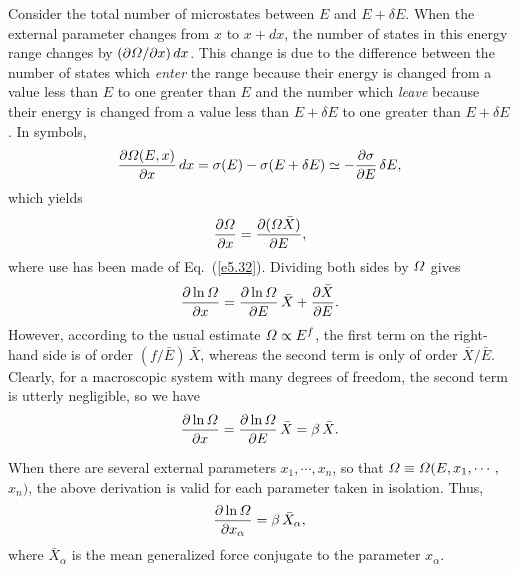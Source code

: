 Consider the total number of microstates between $E$ and $E+\delta E$. When the
external parameter changes from $x$ to $x+dx$, the number of states in this energy
range changes by $(\partial {\mit\Omega}/\partial x)\,dx$. This change is
due to the difference between the number of states which {\em enter}\/ the
range because their energy is changed from a value less than $E$ to one greater than
$E$ and the number which 
{\em leave} 
because their energy is changed from a value less than $E+\delta E$ to one
greater than $E+\delta E$.
In symbols,
\begin{equation}
\frac{\partial {\mit\Omega}(E,x)}{\partial x}\,dx = \sigma(E)- \sigma(E+\delta E)\simeq
-\frac{\partial \sigma}{\partial E}\,\delta E,
\end{equation}
which yields
\begin{equation}
\frac{\partial {\mit\Omega}}{\partial x} = \frac{\partial({\mit\Omega} \bar{X})}{\partial E},
\end{equation}
where use has been made of Eq.~(\ref{e5.32}). Dividing both sides by ${\mit\Omega}$ gives
\begin{equation}
\frac{\partial \ln {\mit\Omega}}{\partial x} = \frac{\partial \ln {\mit\Omega}}{\partial E}\,
\bar{X} +\frac{\partial \bar{X}}{\partial E}.
\end{equation}
However, according to  the usual estimate ${\mit\Omega}\propto E^f$, the first term on the
right-hand side is of order $(f/\bar{E})\,\bar{X}$, whereas the second term is only
of order $\bar{X}/\bar{E}$. 
Clearly, for a macroscopic system with many degrees of freedom,
the second term is utterly negligible, so we have
\begin{equation}
\frac{\partial\ln {\mit\Omega}}{\partial x} = \frac{\partial \ln {\mit\Omega}}{\partial E}
\,\bar{X} = \beta \,\bar{X}.
\end{equation}

When there are several external parameters $x_1, \cdots, x_n$, so that 
${\mit\Omega}\equiv
{\mit\Omega}(E, x_1,\cdots,$ $x_n)$, the above derivation is valid for
 each parameter
taken in isolation. Thus,
\begin{equation}\label{e5.38}
\frac{\partial \ln{\mit\Omega}}{\partial x_\alpha} = \beta\, \bar{X}_\alpha,
\end{equation}
where $\bar{X}_\alpha$ is the mean generalized force conjugate to the parameter 
$x_\alpha$.


